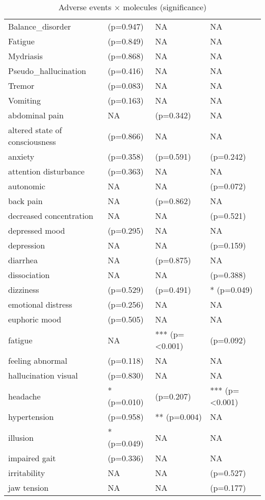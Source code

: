 \begin{table}[!h]
\centering
\caption{Adverse events × molecules (significance)}
\centering
\begin{tabular}[t]{llll}
\toprule
Balance\_disorder & (p=0.947) & NA & NA\\
Fatigue & (p=0.849) & NA & NA\\
Mydriasis & (p=0.868) & NA & NA\\
Pseudo\_hallucination & (p=0.416) & NA & NA\\
Tremor & (p=0.083) & NA & NA\\
\addlinespace
Vomiting & (p=0.163) & NA & NA\\
abdominal pain & NA & (p=0.342) & NA\\
altered state of consciousness & (p=0.866) & NA & NA\\
anxiety & (p=0.358) & (p=0.591) & (p=0.242)\\
attention disturbance & (p=0.363) & NA & NA\\
\addlinespace
autonomic & NA & NA & (p=0.072)\\
back pain & NA & (p=0.862) & NA\\
decreased concentration & NA & NA & (p=0.521)\\
depressed mood & (p=0.295) & NA & NA\\
depression & NA & NA & (p=0.159)\\
\addlinespace
diarrhea & NA & (p=0.875) & NA\\
dissociation & NA & NA & (p=0.388)\\
dizziness & (p=0.529) & (p=0.491) & * (p=0.049)\\
emotional distress & (p=0.256) & NA & NA\\
euphoric mood & (p=0.505) & NA & NA\\
\addlinespace
fatigue & NA & *** (p=<0.001) & (p=0.092)\\
feeling abnormal & (p=0.118) & NA & NA\\
hallucination visual & (p=0.830) & NA & NA\\
headache & * (p=0.010) & (p=0.207) & *** (p=<0.001)\\
hypertension & (p=0.958) & ** (p=0.004) & NA\\
\addlinespace
illusion & * (p=0.049) & NA & NA\\
impaired gait & (p=0.336) & NA & NA\\
irritability & NA & NA & (p=0.527)\\
jaw tension & NA & NA & (p=0.177)\\

\end{tabular}
\end{table}
